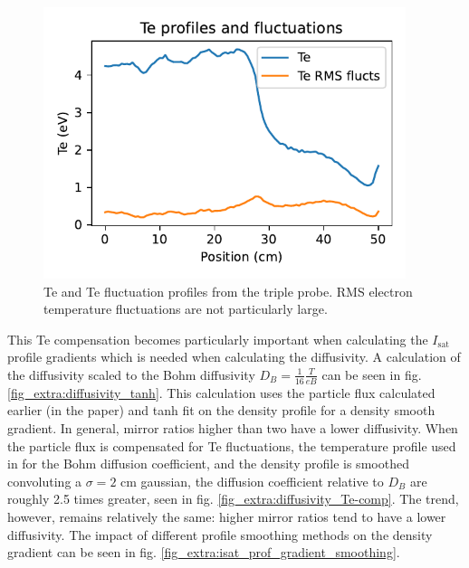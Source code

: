 \begin{figure}
    \centering
    \includegraphics[width=300pt]{figures/extra/Te_prof_flucts.pdf}
    \caption[Triple probe Te and Te fluctuation profiles]{Te and Te fluctuation profiles from the triple probe. RMS electron temperature fluctuations are not particularly large.}
    \label{fig_extra:Te_prof_flucts}
\end{figure}

This Te compensation becomes particularly important when calculating the $I_\text{sat}$ profile gradients which is needed when calculating the diffusivity. A calculation of the diffusivity scaled to the Bohm diffusivity $D_B = \frac{1}{16} \frac{T}{eB}$ can be seen in fig. \ref{fig_extra:diffusivity_tanh}. This calculation uses the particle flux calculated earlier (in the paper) and tanh fit on the density profile for a density smooth gradient. In general, mirror ratios higher than two have a lower diffusivity. When the particle flux is compensated for Te fluctuations, the temperature profile used in for the Bohm diffusion coefficient, and the density profile is smoothed convoluting a $\sigma=2$ cm gaussian, the diffusion coefficient relative to $D_B$ are roughly 2.5 times greater, seen in fig. \ref{fig_extra:diffusivity_Te-comp}. The trend, however, remains relatively the same: higher mirror ratios tend to have a lower diffusivity. The impact of different profile smoothing methods on the density gradient can be seen in fig. \ref{fig_extra:isat_prof_gradient_smoothing}.

